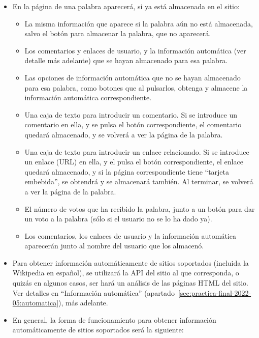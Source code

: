 \begin{itemize}
\item En la página de una palabra aparecerá, si ya está almacenada en el sitio:
  \begin{itemize}
  \item La misma información que aparece si la palabra aún no está almacenada, salvo el botón para almacenar la palabra, que no aparecerá.
  \item Los comentarios y enlaces de usuario, y la información automática (ver detalle más adelante) que se hayan almacenado para esa palabra.
  \item Las opciones de información automática que no se hayan almacenado para esa palabra, como botones que al pulsarlos, obtenga y almacene la información automática correspondiente.
  \item Una caja de texto para introducir un comentario. Si se introduce un comentario en ella, y se pulsa el botón correspondiente, el comentario quedará almacenado, y se volverá a ver la página de la palabra.
  \item Una caja de texto para introducir un enlace relacionado. Si se introduce un enlace (URL) en ella, y el pulsa el botón correspondiente, el enlace quedará almacenado, y si la página correspondiente tiene ``tarjeta embebida'', se obtendrá y se almacenará también. Al terminar, se volverá a ver la página de la palabra.
  \item El número de votos que ha recibido la palabra, junto a un botón para dar un voto a la palabra (sólo si el usuario no se lo ha dado ya).
  \item Los comentarios, los enlaces de usuario y la información automática aparecerán junto al nombre del usuario que los almacenó.
  \end{itemize}

\item Para obtener información automáticamente de sitios soportados (incluida la Wikipedia en español), se utilizará la API del sitio al que corresponda, o quizás en algunos casos, ser hará un análisis de las páginas HTML del sitio. Ver detalles en ``Información automática'' (apartado~\ref{sec:practica-final-2022-05:automatica}), más adelante.

\item En general, la forma de funcionamiento para obtener información automáticamente de sitios soportados será la siguiente:


\end{itemize}
